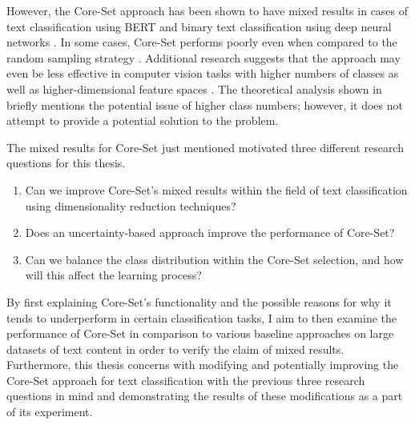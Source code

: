 \documentclass[english,bachelor,ul]{webisthesis} %
\begin{document}
However, the Core-Set approach has been shown to have mixed results in cases of text classification using BERT \citep{DBLP:conf/kdd/0002MM21, DBLP:conf/emnlp/Ein-DorHGSDCDAK20} and binary text classification using deep neural networks \citep{DBLP:conf/cikm/Liu0LZW21}. In some cases, Core-Set performs poorly even when compared to the random sampling strategy \citep{DBLP:conf/kdd/0002MM21, DBLP:conf/aaai/ColemanCKCBBNSZ22}. Additional research suggests that the approach may even be less effective in computer vision tasks with higher numbers of classes as well as higher-dimensional feature spaces \citep{DBLP:conf/iccv/SinhaED19}. The theoretical analysis shown in \cite{DBLP:conf/iclr/SenerS18} briefly mentions the potential issue of higher class numbers; however, it does not attempt to provide a potential solution to the problem.

The mixed results for Core-Set just mentioned motivated three different research questions for this thesis.

\begin{enumerate}
    \item Can we improve Core-Set's mixed results within the field of text classification using dimensionality reduction techniques?
    \item Does an uncertainty-based approach improve the performance of Core-Set?
    \item Can we balance the class distribution within the Core-Set selection, and how will this affect the learning process?
\end{enumerate}



By first explaining Core-Set's functionality and the possible reasons for why it tends to underperform in certain classification tasks, I aim to then examine the performance of Core-Set in comparison to various baseline approaches on large datasets of text content in order to verify the claim of mixed results. Furthermore, this thesis concerns with modifying and potentially improving the Core-Set approach for text classification with the previous three research questions in mind and demonstrating the results of these modifications as a part of its experiment.
\end{document}

